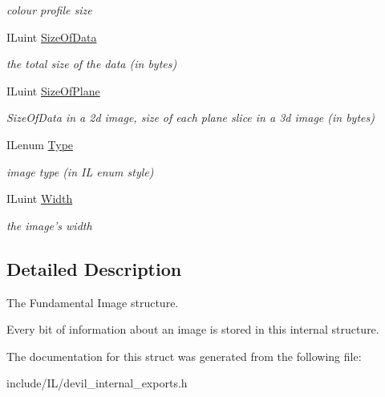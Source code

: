 \begin{DoxyCompactItemize}
\begin{DoxyCompactList}\small\item\em colour profile size \end{DoxyCompactList}\item 
\hypertarget{struct_i_limage_ad3bfe4c8a6696b42835730f7b70327b7}{I\+Luint \hyperlink{struct_i_limage_ad3bfe4c8a6696b42835730f7b70327b7}{Size\+Of\+Data}}\label{struct_i_limage_ad3bfe4c8a6696b42835730f7b70327b7}

\begin{DoxyCompactList}\small\item\em the total size of the data (in bytes) \end{DoxyCompactList}\item 
\hypertarget{struct_i_limage_ae48f15f42689820f0eb4fadffd6174bb}{I\+Luint \hyperlink{struct_i_limage_ae48f15f42689820f0eb4fadffd6174bb}{Size\+Of\+Plane}}\label{struct_i_limage_ae48f15f42689820f0eb4fadffd6174bb}

\begin{DoxyCompactList}\small\item\em Size\+Of\+Data in a 2d image, size of each plane slice in a 3d image (in bytes) \end{DoxyCompactList}\item 
\hypertarget{struct_i_limage_a437e4fc3b579e2e7879dedd0fd2ac587}{I\+Lenum \hyperlink{struct_i_limage_a437e4fc3b579e2e7879dedd0fd2ac587}{Type}}\label{struct_i_limage_a437e4fc3b579e2e7879dedd0fd2ac587}

\begin{DoxyCompactList}\small\item\em image type (in I\+L enum style) \end{DoxyCompactList}\item 
\hypertarget{struct_i_limage_a4146e7b2b0b4097e0e335f9b348392bf}{I\+Luint \hyperlink{struct_i_limage_a4146e7b2b0b4097e0e335f9b348392bf}{Width}}\label{struct_i_limage_a4146e7b2b0b4097e0e335f9b348392bf}

\begin{DoxyCompactList}\small\item\em the image's width \end{DoxyCompactList}\end{DoxyCompactItemize}


\subsection{Detailed Description}
The Fundamental Image structure. 

Every bit of information about an image is stored in this internal structure. 

The documentation for this struct was generated from the following file\+:\begin{DoxyCompactItemize}
\item 
include/\+I\+L/devil\+\_\+internal\+\_\+exports.\+h\end{DoxyCompactItemize}
